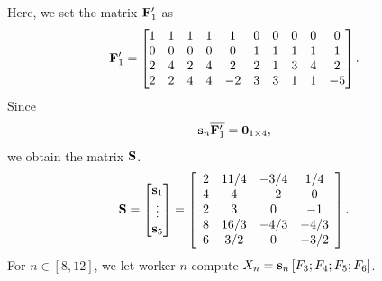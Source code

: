 \documentclass[conference,letterpaper]{IEEEtran}
\begin{document}
\begin{example}
 Here, we set the matrix ${\bf F}^{\prime}_1$ as
\[
{\bf F}^{\prime}_1 = 
\begin{bmatrix}
1 & 1 & 1 & 1 & 1 & 0 & 0 & 0 & 0 & 0 \\
0 & 0 & 0 & 0 & 0 & 1 & 1 & 1 & 1 & 1 \\
2 & 4 & 2 & 4 & 2 & 2 & 1 & 3 & 4 & 2 \\
2 & 2 & 4 & 4 & -2 & 3 & 3 & 1 & 1 & -5
\end{bmatrix}.
\]
Since
\begin{align}
 {\bf s}_{n}\overline{{\bf F}^{\prime}_1} = {\bf 0}_{1 \times 4},
 \label{eq: S }
\end{align}
we obtain the matrix ${\bf S}$.
\begin{equation}
{\bf S} = 
\begin{bmatrix}
{\bf s}_{1} \\
\vdots \\
{\bf s}_{5}
\end{bmatrix} =  
\left[
\begin{array}{cccc}
 2 & 11/4 & -3/4 & 1/4 \\
 4 & 4 & -2 & 0 \\
 2 & 3 & 0 & -1 \\
 8 & 16/3 & -4/3 & -4/3 \\
 6 & 3/2 & 0 & -3/2 \\
\end{array}
\right].
\label{eq:S for example}
\end{equation}
For $n \in [8, 12]$, we let worker $n$ compute $X_n = {\bf s}_{n} 
\left[ F_3;  F_4;  F_5;  F_6 \right]$.


\end{example}
\end{document}
